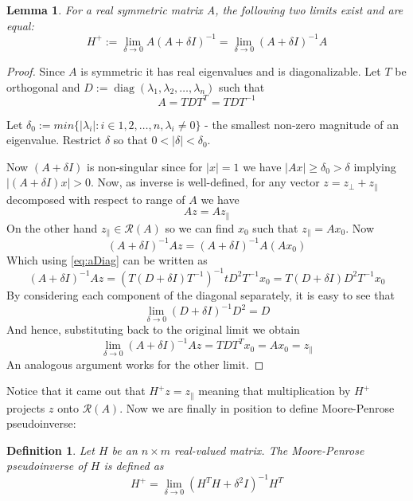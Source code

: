 \documentclass[a4paper,11pt]{article}
\theoremstyle{break}
\newtheorem{definition}{Definition}[section]
\newtheorem{lemma}[theorem]{Lemma}
\newcommand{\Ra}{\mathcal{R}}
\DeclareMathOperator{\diag}{diag}
\newcommand{\pll}{\parallel}
\begin{document}
\begin{lemma}\label{lem:limit_existence_1}
    For a real symmetric matrix A, the following two limits exist and are equal:
    \begin{equation}
        H^+ := \lim_{\delta \to 0} A ( A + \delta I) ^{-1}
            = \lim_{\delta \to 0} ( A + \delta I) ^{-1} A
    \end{equation}
\end{lemma}

\begin{proof}
    Since $A$ is symmetric it has real eigenvalues and is diagonalizable.
    Let $T$ be orthogonal and $D := \diag (\lambda_1, \lambda_2, \ldots, \lambda_n)$ such that
    \begin{equation}
    \label{eq:aDiag}
        A = T D T^T = T D T^{-1}
    \end{equation}
    
    Let $ \delta_0 := min\{ | \lambda_i | : i \in {1, 2, \ldots, n}, \lambda_i \neq 0 \}$ - the smallest non-zero magnitude of an eigenvalue.
    Restrict $ \delta$ so that $ 0 <  | \delta | < \delta_0$.
    
    Now $(A + \delta I)$ is non-singular since for $ | x | = 1$ we have $ | A x | \geq \delta_0 > \delta$
    implying $ | (A + \delta I) x | > 0 $.
    Now, as inverse is well-defined, for any vector $z = z_\perp + z_\pll$ decomposed with respect to range of $A$ we have
    $$ A z = A z_\pll$$
    On the other hand $z_\pll \in \Ra(A)$ so we can find $x_0$ such that $ z_\pll = A x_0$. Now
    $$ (A + \delta I)^{-1} A z = (A + \delta I)^{-1} A (A x_0) $$
    Which using \eqref{eq:aDiag} can be written as
    $$ (A + \delta I)^{-1} A z =
    (T(D + \delta I) T^{-1})^{-1} t D^2 T^{-1} x_0 =
    T (D + \delta I) D^2 T^{-1} x_0
    $$
    By considering each component of the diagonal separately, it is easy to see that
    $$ \lim_{\delta \to 0} (D + \delta I)^{-1} D^2 = D $$
    And hence, substituting back to the original limit we obtain
    $$ \lim_{\delta \to 0} ( A + \delta I) ^{-1} A z = T D T^T x_0 = A x_0 = z_\pll $$
    An analogous argument works for the other limit.
\end{proof}

Notice that it came out that $ H^+ z = z_\pll$ meaning that multiplication by $H^+$ projects $z$ onto $\Ra(A)$. Now we are finally in position to define Moore-Penrose pseudoinverse:

\begin{definition}
    Let $H$ be an $ n \times m $ real-valued matrix.
    The Moore-Penrose pseudoinverse of $H$ is defined as
    $$ H^+ = \lim_{\delta \to 0} ( H^T H + \delta^2 I) ^{-1} H^T $$
\end{definition}
\end{document}
